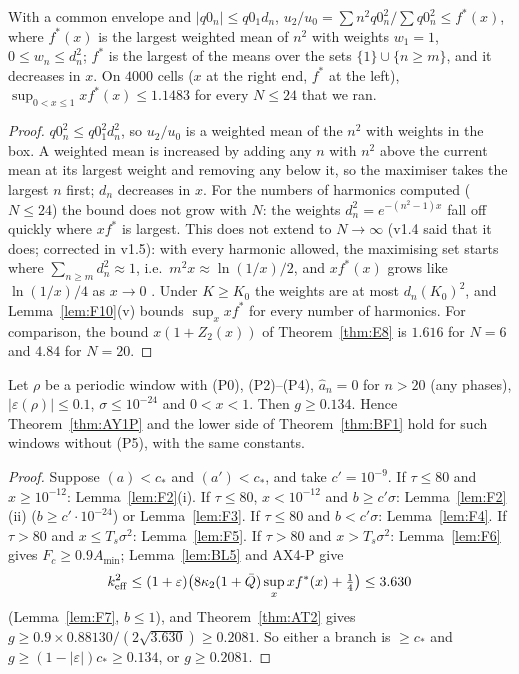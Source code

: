 \begin{lemma} 
\label{lem:F7}
With a common envelope and $|q0_n|\le q0_1d_n$, $u_2/u_0=\sum n^2q0_n^2/\sum q0_n^2\le f^*(x)$, where $f^*(x)$ is the largest weighted mean of $n^2$ with weights
$w_1=1$, $0\le w_n\le d_n^2$; $f^*$ is the largest of the means over the sets $\{1\}\cup\{n\ge m\}$, and it decreases in $x$. On $4000$ cells
($x$ at the right end, $f^*$ at the left), $\sup_{0<x\le1}x f^*(x)\le1.1483$ for every $N\le24$ that we ran.
\end{lemma}
\begin{proof}
$q0_n^2\le q0_1^2d_n^2$, so $u_2/u_0$ is a weighted mean of the $n^2$ with weights in the box. A weighted mean is increased by adding any $n$ with $n^2$ above the
current mean at its largest weight and removing any below it, so the maximiser takes the largest $n$ first; $d_n$ decreases in $x$.
For the numbers of harmonics computed ($N\le24$) the bound does not grow with $N$: the weights $d_n^2=e^{-(n^2-1)x}$ fall off quickly where $xf^*$ is largest.
This does not extend to $N\to\infty$ (v1.4 said that it does; corrected in v1.5): with every harmonic allowed, the maximising set starts where
$\sum_{n\ge m}d_n^2\approx1$, i.e.\ $m^2x\approx\ln(1/x)/2$, and $xf^*(x)$ grows like $\ln(1/x)/4$ as $x\to0$ \derivst.
Under $K\ge K_0$ the weights are at most $d_n(K_0)^2$, and Lemma~\ref{lem:F10}(v) bounds $\sup_xxf^*$ for every number of harmonics. For comparison, the bound $x(1+Z_2(x))$
of Theorem~\ref{thm:E8} is $1.616$ for $N=6$ and $4.84$ for $N=20$.
\end{proof}

\begin{theorem} 
\label{thm:F8}
Let $\rho$ be a periodic window with (P0), (P2)--(P4), $\hat a_n=0$ for $n>20$ (any phases), $|\varepsilon(\rho)|\le0.1$, $\sigma\le10^{-24}$ and $0<x<1$. Then $g\ge0.134$. Hence
Theorem~\ref{thm:AY1P} and the lower side of Theorem~\ref{thm:BF1} hold for such windows without (P5), with the same constants.
\end{theorem}
\begin{proof}
Suppose $(a)<c_*$ and $(a')<c_*$, and take $c'=10^{-9}$. If $\tau\le80$ and $x\ge10^{-12}$: Lemma~\ref{lem:F2}(i). If $\tau\le80$, $x<10^{-12}$ and $b\ge c'\sigma$:
Lemma~\ref{lem:F2}(ii) ($b\ge c'\cdot10^{-24}$) or Lemma~\ref{lem:F3}. If $\tau\le80$ and $b<c'\sigma$: Lemma~\ref{lem:F4}. If $\tau>80$ and $x\le T_s\sigma^2$:
Lemma~\ref{lem:F5}. If $\tau>80$ and $x>T_s\sigma^2$: Lemma~\ref{lem:F6} gives $F_c\ge0.9A_{\min}$; Lemma~\ref{lem:BL5} and AX4-P give
\begin{equation*}
k_{\mathrm{eff}}^2\le(1+\varepsilon)\big(8\kappa_2(1+\bar Q)\sup_xxf^*(x)+\tfrac14\big)\le3.630
\end{equation*}
(Lemma~\ref{lem:F7}, $b\le1$), and Theorem~\ref{thm:AT2} gives $g\ge0.9\times0.88130/(2\sqrt{3.630})\ge0.2081$. So either a branch is $\ge c_*$ and
$g\ge(1-|\varepsilon|)c_*\ge0.134$, or $g\ge0.2081$.
\end{proof}


